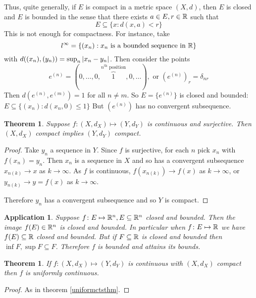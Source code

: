 \documentclass{notes}
\theoremstyle{plain}
\newtheorem{theorem}[proposition]{Theorem}
\newtheorem*{application}{Application}
\begin{document}
Thus, quite generally, if $ E $ is compact in a metric space 
$ (X,d) $, then $ E $ is closed and $ E $ is bounded in the 
sense that there exists $ a \in E, r \in \mathbb{R} $ such that
\[ E \subseteq \{x:d(x,a) < r \} \]
This is not enough for compactness.
For instance, take \[ l^{\infty}=\{ (x_{n}): x_{n} \text{ is a bounded 
sequence in } \mathbb{R}\} \]
with $d( (x_{n}), (y_{n}) ) = \sup_{n}\left|x_{n}-y_{n}\right|$.
Then consider the points
\[ e^{(n)}=(0,\ldots,0, \overbrace{1}^{n^{\text{th}}\text{ position}}
,0,\ldots), \text{ or }
\left( e^{(n)} \right)_{r}= \delta_{nr} \]
Then $d(e^{(n)}, e^{(m)})=1$ for all $ n \neq m $.
So
$E = \{ e^{(n)} \}$ is closed and bounded:
$E \subseteq \{(x_{n}):d(x_{n},0) \leq 1 \}$
But $ \left( e^{(n)} \right) $ has no convergent subsequence.

\begin{theorem}
Suppose $ f\colon (X,d_{X}) \mapsto (Y,d_{Y}) $ is continuous and 
surjective.
Then $ (X,d_{X}) $ compact implies $ (Y,d_{Y})  $ compact.
\end{theorem}

\begin{proof}
Take $ y_{n} $ a sequence in $ Y $.
Since $ f $ is surjective, for each $ n $ pick $ x_{n}  $ with $ 
f(x_{n}) = y_{n} $.
Then $ x_{n} $ is a sequence in $ X $ and so has a convergent 
subsequence $x_{n(k)}\to x$ as $ k \to \infty $.
As $ f $ is continuous,
$f(x_{n(k)}) \to f(x)$ as $ k \to \infty $, or
$y_{n(k)} \to y = f(x)$ as $ k \to \infty $.

Therefore $ y_{n} $ has a convergent subsequence and so $ Y $ is compact.
\end{proof}

\begin{application}
Suppose $ f\colon E \mapsto \mathbb{R}^{n}, E \subseteq \mathbb{R}^{n} $ closed and 
bounded. Then the image $ f(E)\in \mathbb{R}^{n} $ is closed and bounded.
In particular when $ f\colon E \mapsto \mathbb{R} $ we have $ f(E) 
\subseteq \mathbb{R} $ closed and bounded.
But if $ F \subseteq \mathbb{R} $ is closed and bounded then $ \inf F, 
\sup F \subseteq F $.
Therefore $ f $ is bounded and attains its bounds.
\end{application}

\begin{theorem}
If $ f\colon (X, d_{X}) \mapsto (Y,d_{Y}) $ is continuous with $ 
(X,d_{X}) $ compact then $ f $ is uniformly continuous.
\end{theorem}
\begin{proof}
As in theorem \ref{uniformctsthm}.
\end{proof}
\end{document}
